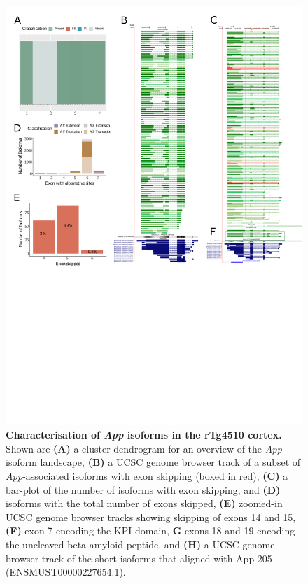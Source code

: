 \begin{figure}[htp]
	\centering
	\includegraphics[page=2,trim={0 2.2cm 0 0},scale = 0.85]{Figures/TargetGenes_Annotation_Portrait.pdf}
	\captionsetup{width=0.95\textwidth}
	\caption[Characterisation of the \textit{App} isoform landscape]%
	{\textbf{Characterisation of \textit{App} isoforms in the rTg4510 cortex.} Shown are \textbf{(A)} a cluster dendrogram for an overview of the \textit{App} isoform landscape, \textbf{(B)} a UCSC genome browser track of a subset of \textit{App}-associated isoforms with exon skipping (boxed in red), \textbf{(C)} a bar-plot of the number of isoforms with exon skipping, and \textbf{(D)} isoforms with the total number of exons skipped, \textbf{(E)} zoomed-in UCSC genome browser tracks showing skipping of exons 14 and 15, \textbf{(F)} exon 7 encoding the KPI domain, \textbf{G} exons 18 and 19 encoding the uncleaved beta amyloid peptide, and \textbf{(H)} a UCSC genome browser track of the short isoforms that aligned with App-205 (ENSMUST00000227654.1).}    
	\label{fig:app}
\end{figure}
\restoregeometry

